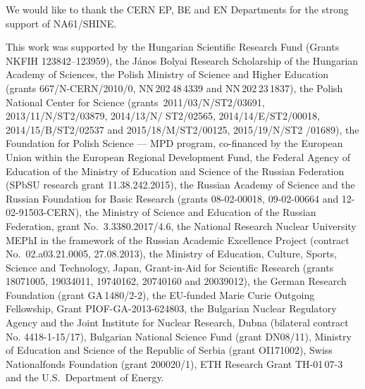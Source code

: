 We would like to thank the CERN EP, BE and EN Departments for the
strong support of NA61/SHINE.

This work was supported by the Hungarian Scientific Research Fund (Grants
NKFIH 123842--123959), the J\'anos Bolyai Research Scholarship
of the Hungarian Academy of Sciences, the Polish Ministry of Science
and Higher Education (grants 667\slash N-CERN\slash2010\slash0,
NN\,202\,48\,4339 and NN\,202\,23\,1837), the Polish National Center
for Science (grants~2011\slash03\slash N\slash ST2\slash03691,
2013\slash11\slash N\slash ST2\slash03879, 2014\slash13\slash N\slash
ST2\slash02565, 2014\slash14\slash E\slash ST2\slash00018,
2014\slash15\slash B\slash ST2\slash02537 and
2015\slash18\slash M\slash ST2\slash00125, 2015\slash 19\slash N\slash ST2 \slash01689), the Foundation for Polish
Science --- MPD program, co-financed by the European Union within the
European Regional Development Fund, the Federal Agency of Education of
the Ministry of Education and Science of the Russian Federation (SPbSU
research grant 11.38.242.2015), the Russian Academy of Science and the
Russian Foundation for Basic Research (grants 08-02-00018, 09-02-00664
and 12-02-91503-CERN), the Ministry of Science and
Education of the Russian Federation, grant No.\ 3.3380.2017\slash4.6,
 the National Research Nuclear
University MEPhI in the framework of the Russian Academic Excellence
Project (contract No.\ 02.a03.21.0005, 27.08.2013),
the Ministry of Education, Culture, Sports,
Science and Tech\-no\-lo\-gy, Japan, Grant-in-Aid for Sci\-en\-ti\-fic
Research (grants 18071005, 19034011, 19740162, 20740160 and 20039012),
the German Research Foundation (grant GA\,1480/2-2), the EU-funded
Marie Curie Outgoing Fellowship, Grant PIOF-GA-2013-624803, the
Bulgarian Nuclear Regulatory Agency and the Joint Institute for
Nuclear Research, Dubna (bilateral contract No. 4418-1-15\slash 17),
Bulgarian National Science Fund (grant DN08/11), Ministry of Education
and Science of the Republic of Serbia (grant OI171002), Swiss
Nationalfonds Foundation (grant 200020/1), ETH Research Grant
TH-01\,07-3 and the U.S.\ Department of Energy.
